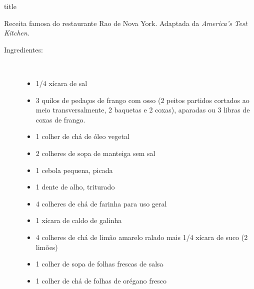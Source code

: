 \documentclass [11pt, letterpaper] {article}
\begin{document}
 {title}


Receita famosa do restaurante Rao de Nova York. Adaptada da {\it America's Test Kitchen}.

\begin {description}

\item [Ingredientes:] \ \\
\begin {itemize}
\item 1/4 xícara de sal
\item 3 quilos de pedaços de frango com osso (2 peitos partidos cortados ao meio transversalmente, 2 baquetas e 2 coxas), aparadas ou 3 libras de coxas de frango.
\item 1 colher de chá de óleo vegetal
\item 2 colheres de sopa de manteiga sem sal
\item 1 cebola pequena, picada
\item 1 dente de alho, triturado
\item 4 colheres de chá de farinha para uso geral
\item 1 xícara de caldo de galinha
\item 4 colheres de chá de limão amarelo ralado mais 1/4 xícara de suco (2 limões)
\item 1 colher de sopa de folhas frescas de salsa
\item 1 colher de chá de folhas de orégano fresco
\end {itemize}


\end{description}
\end{document}
